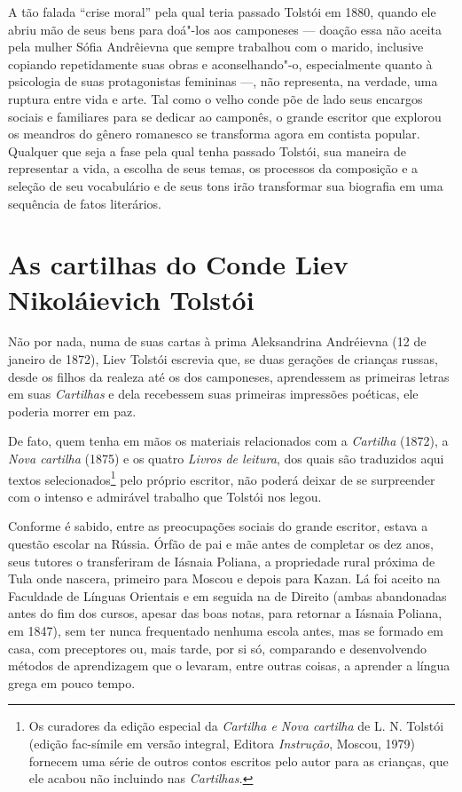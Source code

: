 {{A tão falada ``crise moral'' pela qual teria passado Tolstói em
1880, quando ele abriu mão de seus bens para doá"-los aos camponeses
--- doação essa não aceita pela mulher Sófia Andrêievna que sempre
trabalhou com o marido, inclusive copiando repetidamente suas obras e
aconselhando"-o, especialmente quanto à psicologia de suas protagonistas
femininas ---, não representa, na verdade, uma ruptura entre vida e
arte. Tal como o velho conde põe de lado seus encargos sociais e
familiares para se dedicar ao camponês, o grande escritor que explorou
os meandros do gênero romanesco se transforma agora em contista popular.
Qualquer que seja a fase pela qual tenha passado Tolstói, sua maneira de
representar a vida, a escolha de seus temas, os processos da composição
e a seleção de seu vocabulário e de seus tons irão transformar sua
biografia em uma sequência de fatos literários.

\chapter{As cartilhas do Conde Liev Nikoláievich Tolstói}

Não por nada, numa de suas cartas à prima Aleksandrina Andréievna (12 de
janeiro de 1872), Liev Tolstói escrevia que, se
duas gerações de crianças russas, desde os filhos da realeza até os dos
camponeses, aprendessem as primeiras letras em suas \emph{Cartilhas} e dela
recebessem suas primeiras impressões poéticas, ele poderia morrer em
paz.

De fato, quem tenha em mãos os materiais relacionados com
a \emph{Cartilha} (1872), a \emph{Nova cartilha} (1875) e os
quatro \emph{Livros de leitura}, dos quais são traduzidos aqui textos
selecionados\footnote{Os curadores da edição especial da \emph{Cartilha
  e Nova cartilha} de L. N. Tolstói (edição fac-símile em versão
  integral, Editora \emph{Instrução}, Moscou, 1979) fornecem uma série
  de outros contos escritos pelo autor para as crianças, que ele acabou
  não incluindo nas \emph{Cartilhas.}} pelo próprio escritor, não poderá deixar de se
surpreender com o intenso e admirável trabalho que Tolstói nos legou.

Conforme é sabido, entre as preocupações sociais do grande escritor,
estava a questão escolar na Rússia. Órfão de pai e mãe antes de
completar os dez anos, seus tutores o transferiram de Iásnaia Poliana, a
propriedade rural próxima de Tula onde nascera, primeiro para Moscou e
depois para Kazan. Lá foi aceito na Faculdade de Línguas Orientais e em
seguida na de Direito (ambas abandonadas antes do fim dos
cursos, apesar das boas notas, para retornar a Iásnaia Poliana, em
1847), sem ter nunca frequentado nenhuma escola antes, mas se formado em
casa, com preceptores ou, mais tarde, por si só, comparando e
desenvolvendo métodos de aprendizagem que o levaram, entre outras
coisas, a aprender a língua grega em pouco tempo. 

}}
